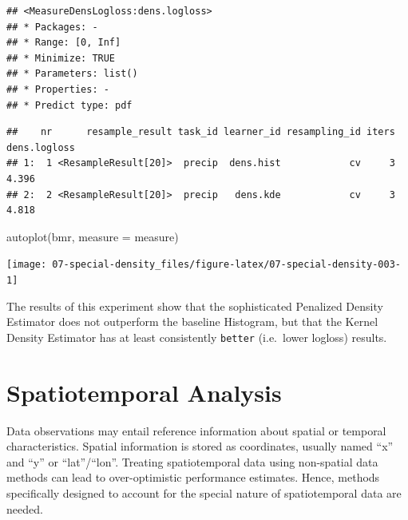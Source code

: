 \documentclass[
]{scrbook}
\newenvironment{Shaded}{\begin{snugshade}}{\end{snugshade}}
\newcommand{\AttributeTok}[1]{\textcolor[rgb]{0.77,0.63,0.00}{#1}}
\newcommand{\DecValTok}[1]{\textcolor[rgb]{0.00,0.00,0.81}{#1}}
\newcommand{\FunctionTok}[1]{\textcolor[rgb]{0.00,0.00,0.00}{#1}}
\newcommand{\NormalTok}[1]{#1}
\newcommand{\OtherTok}[1]{\textcolor[rgb]{0.56,0.35,0.01}{#1}}
\newcommand{\SpecialCharTok}[1]{\textcolor[rgb]{0.00,0.00,0.00}{#1}}
\newcommand{\StringTok}[1]{\textcolor[rgb]{0.31,0.60,0.02}{#1}}
\renewenvironment{Shaded} {\begin{snugshade}\small} {\end{snugshade}}
\begin{document}
\begin{verbatim}
## <MeasureDensLogloss:dens.logloss>
## * Packages: -
## * Range: [0, Inf]
## * Minimize: TRUE
## * Parameters: list()
## * Properties: -
## * Predict type: pdf
\end{verbatim}

\begin{Shaded}
\end{Shaded}

\begin{verbatim}
##    nr      resample_result task_id learner_id resampling_id iters dens.logloss
## 1:  1 <ResampleResult[20]>  precip  dens.hist            cv     3        4.396
## 2:  2 <ResampleResult[20]>  precip   dens.kde            cv     3        4.818
\end{verbatim}

\begin{Shaded}
\begin{Highlighting}[]
\FunctionTok{autoplot}\NormalTok{(bmr, }\AttributeTok{measure =}\NormalTok{ measure)}
\end{Highlighting}
\end{Shaded}

\begin{center}\texttt{[image: 07-special-density\_files/figure-latex/07-special-density-003-1]} \end{center}

The results of this experiment show that the sophisticated Penalized Density Estimator does not outperform the baseline Histogram, but that the Kernel Density Estimator has at least consistently \texttt{better} (i.e.~lower logloss) results.

\hypertarget{spatiotemporal}{%
\section{Spatiotemporal Analysis}\label{spatiotemporal}}

Data observations may entail reference information about spatial or temporal characteristics.
Spatial information is stored as coordinates, usually named ``x'' and ``y'' or ``lat''/``lon''.
Treating spatiotemporal data using non-spatial data methods can lead to over-optimistic performance estimates.
Hence, methods specifically designed to account for the special nature of spatiotemporal data are needed.
\end{document}
